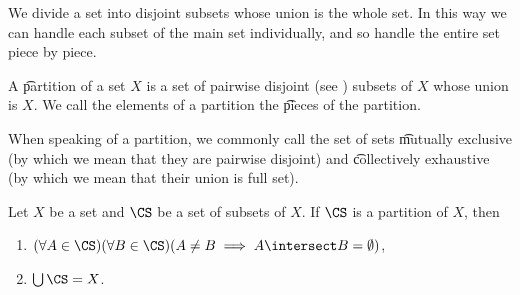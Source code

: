 

We divide a set into disjoint subsets whose union is the whole set.
In this way we can handle each subset of the main set individually, and so handle the entire set piece by piece.


A \t{partition} of a set $X$ is a set of pairwise disjoint (see ) subsets of $X$ whose union is $X$.
We call the elements of a  partition the \t{pieces} of the partition.

When speaking of a partition, we commonly call the set of sets \t{mutually exclusive} (by which we mean that they are pairwise disjoint) and \t{collectively exhaustive} (by which we mean that their union is full set).


Let $X$ be a set and $\CS$ be a set of subsets of $X$.
If $\CS$ is a partition of $X$, then
\begin{enumerate}
\item $(\forall A \in \CS)(\forall B \in \CS)(A \neq B \implies A \intersect B = \emptyset)$,
\item $\bigcup \CS = X$.
\end{enumerate}

\blankpage
